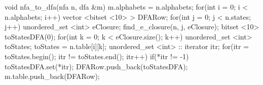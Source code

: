 void nfa_to_dfa(nfa n, dfa &m)
{
    m.alphabets = n.alphabets;
    for(int i = 0; i < n.alphabets; i++) {
        vector <bitset <10> > DFARow;
        for(int j = 0; j < n.states; j++) {
            unordered_set <int> eClosure;
            find_e_closure(n, j, eClosure);
            bitset <10> toStatesDFA(0);
            for(int k = 0; k < eClosure.size(); k++) {
                unordered_set <int> toStates;
                toStates = n.table[i][k];
                unordered_set <int> :: iterator itr;
                for(itr = toStates.begin(); itr != toStates.end(); itr++) {
                    if(*itr != -1) {
                        toStatesDFA.set(*itr);
                    }
                }
            }
            DFARow.push_back(toStatesDFA);
        }
        m.table.push_back(DFARow);
    }
}